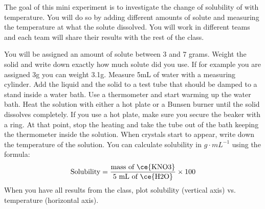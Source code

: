 \documentclass[main.tex]{subfiles}
\begin{document}


 


 \vspace{0.2cm}{\large \bfseries 2. Change of solubility with temperature}
The goal of this mini experiment is to investigate the change of solubility of  with temperature. You will do so by adding different amounts of solute and measuring the temperature at what the solute dissolved. You will work in different teams and each team will share their results with the rest of the class.
\begin{steps}
    \newstep[]  You will be assigned an amount of solute between 3 and 7 grams. Weight the solid and write down exactly how much solute did you use. If for example you are assigned 3g you can weight 3.1g.
        \newstep[]  Measure 5mL of water with a measuring cylinder. Add the liquid and the solid to a test tube that should be damped to a stand inside a water bath. Use a thermometer and start warming up the water bath.
          \newstep[]  Heat the solution with either a hot plate or a Bunsen burner until the solid dissolves completely. If you use a hot plate, make sure you secure the beaker with a ring. At that point, stop the heating and take the tube out of the bath keeping the thermometer inside the solution. When crystals start to appear, write down the temperature of the solution. You can calculate solubility in $g\cdot mL^{-1}$ using the formula:
          \[\text{Solubility}=\frac{\text{mass of \ce{KNO3}}}{\text{5 mL of \ce{H2O}}}\times 100\]
           \newstep[] When you have all results from the class, plot solubility (vertical axis) vs. temperature (horizontal axis).
       \end{steps}
\vspace{2cm}
\end{document}
